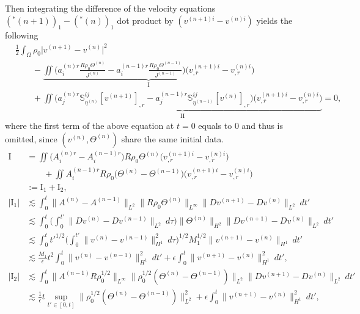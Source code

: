 \documentclass[12pt,a4paper]{amsart}
\numberwithin{equation}{section}
\theoremstyle{plain}
\theoremstyle{definition}
\begin{document}
Then integrating the difference of the velocity equations $(^*(n+1))_1-(^*(n))_1$ dot product by $(v^{(n+1)i}-v^{(n)i})$ yields the following
\begin{align*}
&\frac{1}{2}\int_{\Omega}\rho_{0}\Big| v^{(n+1)}-v^{(n)} \Big|^2 \\
&\qquad -\underbrace{\iint \Big(a^{(n)r}_i \frac{R\rho_{0}\Theta^{(n)} }{J^{(n)}}-a^{(n-1)r}_i \frac{R\rho_{0}\Theta^{(n-1)} }{J^{(n-1)}}  \Big) \Big(v^{(n+1)i}_{,r}-v^{(n)i}_{,r}\Big)}_{\mathrm{I}}\\
&\qquad +\underbrace{\iint \Big( a^{(n)r}_j\mathbb{S}^{ij}_{\eta^{(n)}}[v^{(n+1)}]_{,r}-a^{(n-1)r}_j\mathbb{S}^{ij}_{\eta^{(n-1)}}[v^{(n)}]_{,r} \Big)\Big(v^{(n+1)i}_{,r}-v^{(n)i}_{,r}\Big)}_{\mathrm{II}}=0,
\end{align*}
where the first term of the above equation at $t=0$ equals to $0$ and thus is omitted, since  $(v^{(n)},\Theta^{(n)})$ share the same initial data. 
\begin{align*}
\mathrm{I}&=\iint \Big(A^{(n)r}_i -A^{(n-1)r}_i \Big)R\rho_{0}\Theta^{(n)} \Big(v^{(n+1)i}_{,r}-v^{(n)i}_{,r}\Big)\\
&\qquad +\iint A^{(n-1)r}_iR\rho_{0}\Big(\Theta^{(n)}-\Theta^{(n-1)}  \Big) \Big(v^{(n+1)i}_{,r}-v^{(n)i}_{,r}\Big)\\
&:= \mathrm{I}_1+\mathrm{I}_2,\\
|\mathrm{I}_1|&\lesssim\int_{0}^{t}\|A^{(n)}-A^{(n-1)}\|_{L^2}\|R\rho_{0}\Theta^{(n)}\|_{L^{\infty}}\|Dv^{(n+1)}-Dv^{(n)}\|_{L^2} \ dt'\\
&\lesssim \int_{0}^{t} \Big( \int_{0}^{t'} \|Dv^{(n)}-Dv^{(n-1)}\|_{L^2} \ d\tau \Big) \|\Theta^{(n)}\|_{H^2}\|Dv^{(n+1)}-Dv^{(n)}\|_{L^2}\ dt'\\
&\lesssim \int_{0}^{t} t'^{1/2} \Big(\int_{0}^{t'} \|v^{(n)}-v^{(n-1)}\|_{H^1}^2 \ d\tau \Big)^{1/2} M_1^{1/2}\|v^{(n+1)}-v^{(n)}\|_{H^1}\ dt'\\
&\lesssim \frac{M_1}{\epsilon}t^2 \int_{0}^{t} \|v^{(n)}-v^{(n-1)}\|_{H^1}^2 \ dt' +\epsilon\int_{0}^{t} \|v^{(n+1)}-v^{(n)}\|_{H^1}^2 \ dt',\\
|\mathrm{I}_2|&\lesssim \int_{0}^{t} \|A^{(n-1)}R\rho_{0}^{1/2}\|_{L^{\infty}}\|\rho_{0}^{1/2}(\Theta^{(n)}-\Theta^{(n-1)})\|_{L^{2}}\|Dv^{(n+1)}-Dv^{(n)}\|_{L^2} \ dt'\\
&\lesssim \frac{1}{\epsilon}t\sup\limits_{t'\in[0,t]}\|\rho_{0}^{1/2}(\Theta^{(n)}-\Theta^{(n-1)})\|_{L^{2}}^2 +\epsilon\int_{0}^{t} \|v^{(n+1)}-v^{(n)}\|_{H^1}^2 \ dt',%
\end{align*}
\end{document}

